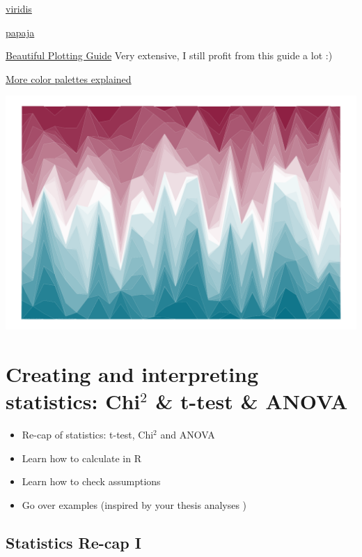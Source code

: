 \documentclass[
]{book}
\providecommand{\tightlist}{%
  \setlength{\itemsep}{0pt}\setlength{\parskip}{0pt}}
\begin{document}
\href{https://sjmgarnier.github.io/viridisLite/reference/viridis.html}{viridis}

\href{https://www.rdocumentation.org/packages/papaja/versions/0.1.2}{papaja}

\href{https://www.cedricscherer.com/2019/08/05/a-ggplot2-tutorial-for-beautiful-plotting-in-r/}{Beautiful Plotting Guide} Very extensive, I still profit from this guide a lot :)

\href{http://www.sthda.com/english/wiki/ggplot2-colors-how-to-change-colors-automatically-and-manually}{More color palettes explained}

\includegraphics{_main_files/figure-latex/unikn-plot-1.pdf}

\chapter{\texorpdfstring{Creating and interpreting statistics: Chi\(^2\) \& t-test \& ANOVA}{Creating and interpreting statistics: Chi\^{}2 \& t-test \& ANOVA}}\label{creating-and-interpreting-statistics-chi2-t-test-anova}

\begin{itemize}
\tightlist
\item
  Re-cap of statistics: t-test, Chi\(^2\) and ANOVA
\item
  Learn how to calculate in R
\item
  Learn how to check assumptions
\item
  Go over examples (inspired by your thesis analyses )
\end{itemize}

\section{\texorpdfstring{Statistics Re-cap I}{Statistics Re-cap  I}}\label{statistics-re-cap-i}
\end{document}

